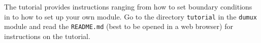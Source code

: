 The tutorial provides instructions ranging from how to set boundary conditions in \Dumux to how to set up your own \Dumux module.
Go to the directory \texttt{tutorial} in the \texttt{dumux} module and read the \texttt{README.md} (best to be opened in a web browser) for instructions on the tutorial.
